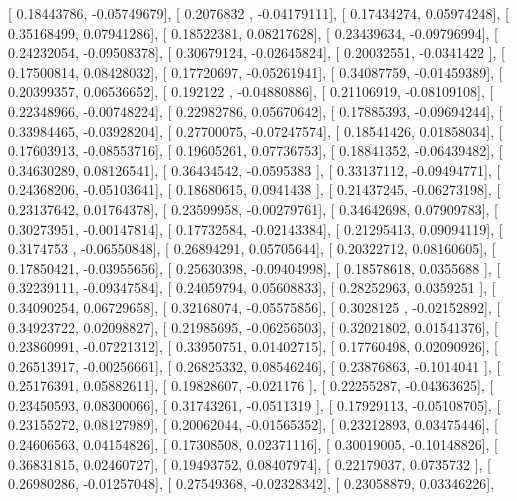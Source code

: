 \documentclass{article}
\begin{document}
       [ 0.18443786, -0.05749679],
       [ 0.2076832 , -0.04179111],
       [ 0.17434274,  0.05974248],
       [ 0.35168499,  0.07941286],
       [ 0.18522381,  0.08217628],
       [ 0.23439634, -0.09796994],
       [ 0.24232054, -0.09508378],
       [ 0.30679124, -0.02645824],
       [ 0.20032551, -0.0341422 ],
       [ 0.17500814,  0.08428032],
       [ 0.17720697, -0.05261941],
       [ 0.34087759, -0.01459389],
       [ 0.20399357,  0.06536652],
       [ 0.192122  , -0.04880886],
       [ 0.21106919, -0.08109108],
       [ 0.22348966, -0.00748224],
       [ 0.22982786,  0.05670642],
       [ 0.17885393, -0.09694244],
       [ 0.33984465, -0.03928204],
       [ 0.27700075, -0.07247574],
       [ 0.18541426,  0.01858034],
       [ 0.17603913, -0.08553716],
       [ 0.19605261,  0.07736753],
       [ 0.18841352, -0.06439482],
       [ 0.34630289,  0.08126541],
       [ 0.36434542, -0.0595383 ],
       [ 0.33137112, -0.09494771],
       [ 0.24368206, -0.05103641],
       [ 0.18680615,  0.0941438 ],
       [ 0.21437245, -0.06273198],
       [ 0.23137642,  0.01764378],
       [ 0.23599958, -0.00279761],
       [ 0.34642698,  0.07909783],
       [ 0.30273951, -0.00147814],
       [ 0.17732584, -0.02143384],
       [ 0.21295413,  0.09094119],
       [ 0.3174753 , -0.06550848],
       [ 0.26894291,  0.05705644],
       [ 0.20322712,  0.08160605],
       [ 0.17850421, -0.03955656],
       [ 0.25630398, -0.09404998],
       [ 0.18578618,  0.0355688 ],
       [ 0.32239111, -0.09347584],
       [ 0.24059794,  0.05608833],
       [ 0.28252963,  0.0359251 ],
       [ 0.34090254,  0.06729658],
       [ 0.32168074, -0.05575856],
       [ 0.3028125 , -0.02152892],
       [ 0.34923722,  0.02098827],
       [ 0.21985695, -0.06256503],
       [ 0.32021802,  0.01541376],
       [ 0.23860991, -0.07221312],
       [ 0.33950751,  0.01402715],
       [ 0.17760498,  0.02090926],
       [ 0.26513917, -0.00256661],
       [ 0.26825332,  0.08546246],
       [ 0.23876863, -0.1014041 ],
       [ 0.25176391,  0.05882611],
       [ 0.19828607, -0.021176  ],
       [ 0.22255287, -0.04363625],
       [ 0.23450593,  0.08300066],
       [ 0.31743261, -0.0511319 ],
       [ 0.17929113, -0.05108705],
       [ 0.23155272,  0.08127989],
       [ 0.20062044, -0.01565352],
       [ 0.23212893,  0.03475446],
       [ 0.24606563,  0.04154826],
       [ 0.17308508,  0.02371116],
       [ 0.30019005, -0.10148826],
       [ 0.36831815,  0.02460727],
       [ 0.19493752,  0.08407974],
       [ 0.22179037,  0.0735732 ],
       [ 0.26980286, -0.01257048],
       [ 0.27549368, -0.02328342],
       [ 0.23058879,  0.03346226],
\end{document}
